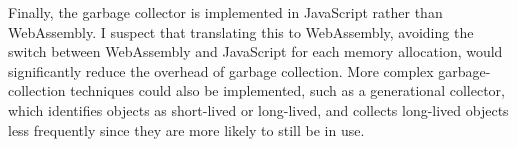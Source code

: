 Finally, the garbage collector is implemented in JavaScript rather than WebAssembly. I suspect that translating this to WebAssembly, avoiding the switch between WebAssembly and JavaScript for each memory allocation, would significantly reduce the overhead of garbage collection. More complex garbage-collection techniques could also be implemented, such as a generational collector, which identifies objects as short-lived or long-lived, and collects long-lived objects less frequently since they are more likely to still be in use.



